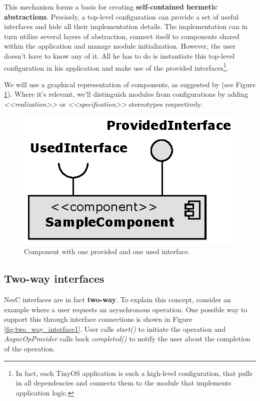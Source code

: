This mechanism forms a basis for creating {\bf self-contained hermetic abstractions}. Precisely, a top-level configuration can provide a set of useful interfaces and hide all their implementation details. The implementation can in turn utilize several layers of abstraction, connect itself to components shared within the application and manage module initialization. However, the user doesn't have to know any of it. All he has to do is instantiate this top-level configuration in his application and make use of the provided interfaces\footnote{In fact, each TinyOS application is such a high-level configuration, that pulls in all dependencies and connects them to the module that implements application logic.}.

We will use a graphical representation of components, as suggested by \cite{Bachmaier} (see Figure \ref{fig:example_component}). Where it's relevant, we'll distinguish modules from configurations by adding \emph{<<realization>>} or \emph{<<specification>>} stereotypes respectively.

\begin{figure}[h]
  \centering
  \includegraphics{diagrams/example_component.eps}
  \caption{Component with one provided and one used interface.}
  \label{fig:example_component}
\end{figure}

\subsection{Two-way interfaces}

NesC interfaces are in fact {\bf two-way}. To explain this concept, consider an example where a user requests an asynchronous operation. One possible way to support this through interface connections is shown in Figure \ref{fig:two_way_interface1}. User calls \emph{start()} to initiate the operation and \emph{AsyncOpProvider} calls back \emph{completed()} to notify the user about the completion of the operation.

